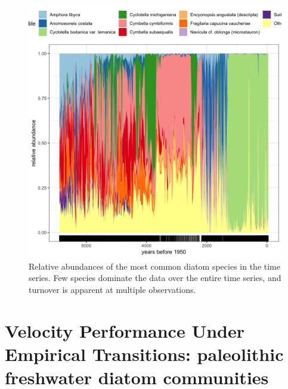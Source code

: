 \documentclass[print]{nuthesis}
\begin{document}
\begin{figure}
\includegraphics[width=0.85\linewidth]{./chapterFiles/velocity/figsCalledInDiss/paleoTurnover} \caption{Relative abundances of the most common diatom species in the time series. Few species dominate the data over the entire time series, and turnover is apparent at multiple observations.}\label{fig:paleoTurnover}
\end{figure}
\hypertarget{velocity-performance-under-empirical-transitions-paleolithic-freshwater-diatom-communities}{%
\section{Velocity Performance Under Empirical Transitions: paleolithic freshwater diatom communities}\label{velocity-performance-under-empirical-transitions-paleolithic-freshwater-diatom-communities}}
\end{document}
